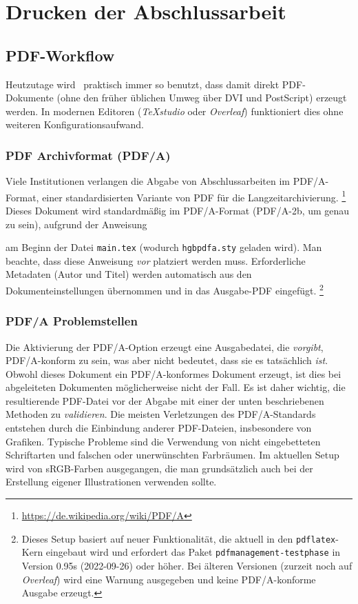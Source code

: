 \chapter{Drucken der Abschlussarbeit}
\label{cha:Drucken}


\section{PDF-Workflow}
\label{sec:pdf}

Heutzutage wird \latex\ praktisch immer so benutzt, dass damit direkt PDF-Dokumente
(ohne den früher üblichen Umweg über DVI und PostScript) erzeugt werden.
In modernen Editoren (\zB \emph{TeXstudio} oder \emph{Overleaf}) funktioniert dies
ohne weiteren Konfigurationsaufwand.


\subsection{PDF Archivformat (PDF/A)}
\label{sec:PDFA}

Viele Institutionen verlangen die Abgabe von Abschlussarbeiten im PDF/A-Format, einer
standardisierten Variante von PDF für die Langzeitarchivierung.%
\footnote{\url{https://de.wikipedia.org/wiki/PDF/A}}
Dieses Dokument wird standardmäßig im PDF/A-Format (PDF/A-2b, um genau zu sein),
aufgrund der Anweisung
%
\begin{LaTeXCode}[numbers=none]
\RequirePackage{hgbpdfa}
\end{LaTeXCode}
%
am Beginn der Datei \verb!main.tex! (wodurch \verb!hgbpdfa.sty! geladen wird).
Man beachte, dass diese Anweisung \emph{vor} \verb!! platziert
werden muss. Erforderliche Meta\-daten (\zB Autor und Titel) werden automatisch
aus den Dokumenteinstellungen übernommen und in das Ausgabe-PDF eingefügt.%
\footnote{Dieses Setup basiert auf neuer Funktionalität, die aktuell in den
\texttt{pdflatex}-Kern eingebaut wird und erfordert das Paket 
\texttt{pdfmanagement-testphase} in Version 0.95s (2022-09-26) oder höher.
Bei älteren Versionen (\zB zurzeit noch auf \emph{Overleaf}) wird eine Warnung
ausgegeben und keine PDF/A-konforme Ausgabe erzeugt.}


\subsection{PDF/A Problemstellen}
\label{sec:PDFA-issues}

Die Aktivierung der PDF/A-Option erzeugt eine Ausgabedatei, die \emph{vorgibt},
PDF/A-konform zu sein, was aber nicht bedeutet, dass sie es tatsächlich \emph{ist}.
Obwohl dieses Dokument ein PDF/A-konformes Dokument erzeugt, ist dies bei abgeleiteten
Dokumenten möglicherweise nicht der Fall. Es ist daher wichtig, die resultierende
PDF-Datei vor der Abgabe mit einer der unten beschriebenen Methoden zu 
\emph{validieren}. Die meisten Verletzungen des PDF/A-Standards entstehen durch 
die Einbindung anderer PDF-Dateien, insbesondere von Grafiken. Typische Probleme 
sind die Verwendung von nicht eingebetteten Schriftarten und falschen oder 
unerwünschten Farbräumen. Im aktuellen Setup wird von sRGB-Farben ausgegangen, die man
grundsätzlich auch bei der Erstellung eigener Illustrationen verwenden sollte.

